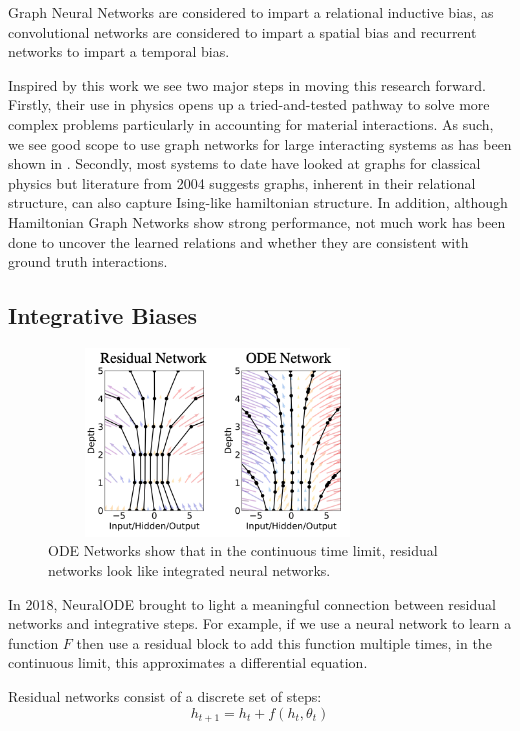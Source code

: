 \documentclass{article}
\begin{document}
Graph Neural Networks are considered to impart a relational inductive bias, as convolutional networks are considered to impart a spatial bias and recurrent networks to impart a temporal bias. 

Inspired by this work we see two major steps in moving this research forward. Firstly, their use in physics opens up a tried-and-tested pathway to solve more complex problems particularly in accounting for material interactions. As such, we see good scope to use graph networks for large interacting systems as has been shown in \cite{sanchez-gonzalez_learning_2020}. Secondly, most systems to date have looked at graphs for classical physics but literature from 2004 suggests graphs, inherent in their relational structure, can also capture Ising-like hamiltonian structure. In addition, although Hamiltonian Graph Networks show strong performance, not much work has been done to uncover the learned relations and whether they are consistent with ground truth interactions.


\subsection{Integrative Biases}

\begin{figure}[h]
\centering
\includegraphics[width=0.8\textwidth,height=5cm]{figures/2odenet.png}
\caption{ ODE Networks \cite{chen_neural_2018} show that in the continuous time limit, residual networks look like integrated neural networks.}
\label{fig.odenet}
\end{figure}
In 2018, NeuralODE brought to light a meaningful connection between residual networks and integrative steps. For example, if we use a neural network to learn a function $F$ then use a residual block to add this function multiple times, in the continuous limit, this approximates a differential equation.

Residual networks consist of a discrete set of steps:
\begin{equation}
h_{t+1} = h_t + f(h_t,\theta_t)
\end{equation}
\end{document}

